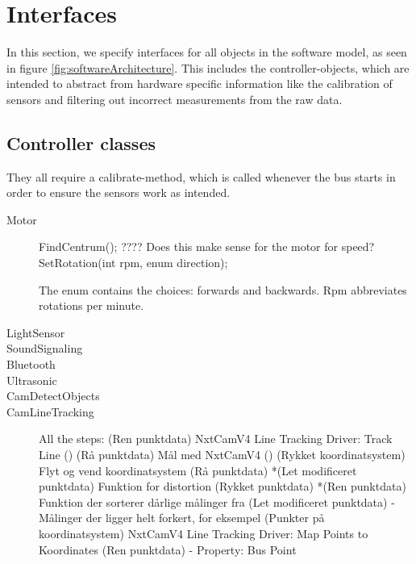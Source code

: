 \section{Interfaces}
In this section, we specify interfaces for all objects in the software model, as seen in figure \ref{fig:softwareArchitecture}. This includes the controller-objects, which are intended to abstract from hardware specific information like the calibration of sensors and filtering out incorrect measurements from the raw data. 



\subsection{Controller classes}
They all require a calibrate-method, which is called whenever the bus starts in order to ensure the sensors work as intended. 


\begin{description}
    \item [Motor]
    FindCentrum(); ???? Does this make sense for the motor for speed?
    SetRotation(int rpm, enum direction);
    
    
    The enum contains the choices: forwards and backwards. Rpm abbreviates rotations per minute.
    
    \item [LightSensor]
    \item [SoundSignaling]
    \item [Bluetooth]
    \item [Ultrasonic]
    \item [CamDetectObjects]
    \item [CamLineTracking]
    All the steps:
    (Ren punktdata) NxtCamV4 Line Tracking Driver: Track Line ()
	(Rå punktdata) Mål med NxtCamV4 ()
	(Rykket koordinatsystem) Flyt og vend koordinatsystem (Rå punktdata)
	*(Let modificeret punktdata) Funktion for distortion (Rykket punktdata)
	*(Ren punktdata) Funktion der sorterer dårlige målinger fra (Let modificeret punktdata)			- Målinger der ligger helt forkert, for eksempel
	(Punkter på koordinatsystem) NxtCamV4 Line Tracking Driver: Map Points to Koordinates (Ren punktdata)
	- Property: Bus Point

    
\end{description}


